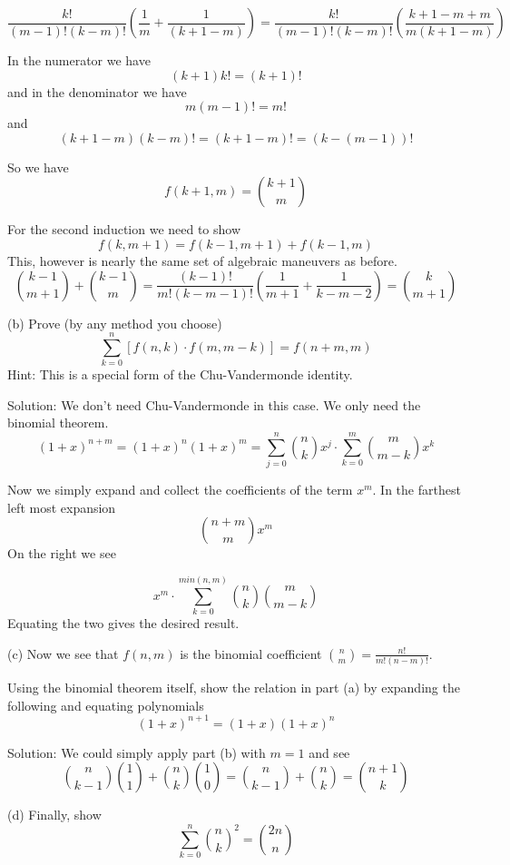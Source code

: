 \documentclass[16 pt]{amsart}
\theoremstyle{definition}
\theoremstyle{remark}
\numberwithin{equation}{subsection}
\begin{document}
\[
\frac{k!}{(m-1)!(k-m)!}\left(\frac{1}{m} + \frac{1}{(k+1-m)}\right) = \frac{k!}{(m-1)!(k-m)!}\left(\frac{k+1-m+m}{m(k+1-m)} \right)
\]

In the numerator we have 
\[
(k+1)k! = (k+1)!
\] 
and in the denominator we have 
\[
m(m-1)! = m!
\] 
and 
\[
(k+1-m)(k-m)! = (k + 1 - m)! = (k-(m-1))!
\]

So we have
\[
f(k+1,m) = {k+1 \choose m}
\]


For the second induction we need to show
\[
f(k,m+1) = f(k-1,m+1) + f(k-1,m)
\]
This, however is nearly the same set of algebraic maneuvers as before.  
\[
{k-1 \choose m+1} + {k-1 \choose m} = \frac{(k-1)!}{m!(k-m-1)!}\left(\frac{1}{m+1} + \frac{1}{k-m-2 }\right) = {k \choose m+1}
\]


\vspace{.5in}

(b) Prove (by any method you choose)
\[
\sum_{k=0}^{n} [f(n,k)\cdot f(m,m-k)] = f(n+m,m) 
\]
Hint: This is a special form of the Chu-Vandermonde identity.
 
\vspace{.5in}
 
Solution: We don't need Chu-Vandermonde in this case.  We only need the binomial theorem.
\[
(1+x)^{n+m} = (1+x)^n(1+x)^m = \sum_{j=0}^{n}{n \choose k}x^j \cdot \sum_{k=0}^{m}{m \choose m-k} x^{k} 
\]
 
Now we simply expand and collect the coefficients of the term $x^m$.  In the farthest left most expansion
\[
{n+m \choose m} x^m
\]
On the right we see

\[
x^m \cdot \sum_{k=0}^{min(n,m)} {n\choose k}{m\choose m-k}
\] 
Equating the two gives the desired result. 

\vspace{.5in} 
 
(c) Now we see that $f(n,m)$ is the binomial coefficient $\binom{n}{m} = \frac{n!}{m!(n-m)!}$.

Using the binomial theorem itself, show the relation in part (a) by expanding the following and equating polynomials
\[
(1+x)^{n+1} = (1+x)(1+x)^n
\]

\vspace{.5in}

Solution: We could simply apply part (b) with $m=1$ and see
\[
{n \choose k-1}{1 \choose 1} + {n \choose k}{1 \choose 0} = {n \choose k-1} + {n \choose k} = {n+1 \choose k}
\]

\vspace{.5in}
 
(d) Finally, show
\[
\sum_{k=0}^{n} \binom{n}{k}^2 = \binom{2n}{n}
\] 
\end{document}
